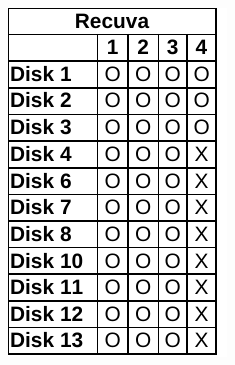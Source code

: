 \begin{paraphrase}
\begin{figure}
\begin{subfigure}{0.17\linewidth}
        \includegraphics[width=\linewidth]{fig/recuva_results_ntfs.pdf}
    \end{subfigure}~~
    \begin{subfigure}{0.17\linewidth}

\end{subfigure}
\end{figure}
\end{paraphrase}
